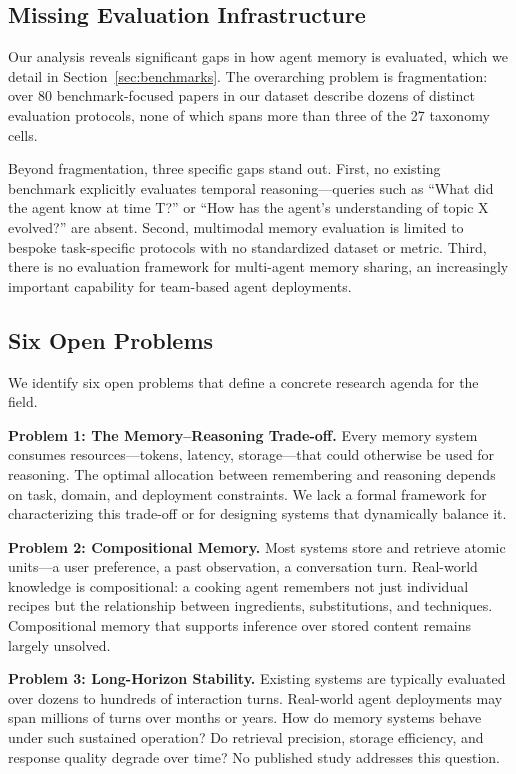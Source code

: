 \subsection{Missing Evaluation Infrastructure}

Our analysis reveals significant gaps in how agent memory is evaluated, which we detail in Section~\ref{sec:benchmarks}. The overarching problem is fragmentation: over 80 benchmark-focused papers in our dataset describe dozens of distinct evaluation protocols, none of which spans more than three of the 27 taxonomy cells.

Beyond fragmentation, three specific gaps stand out. First, no existing benchmark explicitly evaluates temporal reasoning---queries such as ``What did the agent know at time T?'' or ``How has the agent's understanding of topic X evolved?'' are absent. Second, multimodal memory evaluation is limited to bespoke task-specific protocols with no standardized dataset or metric. Third, there is no evaluation framework for multi-agent memory sharing, an increasingly important capability for team-based agent deployments.

\subsection{Six Open Problems}

We identify six open problems that define a concrete research agenda for the field.

\textbf{Problem 1: The Memory--Reasoning Trade-off.} Every memory system consumes resources---tokens, latency, storage---that could otherwise be used for reasoning. The optimal allocation between remembering and reasoning depends on task, domain, and deployment constraints. We lack a formal framework for characterizing this trade-off or for designing systems that dynamically balance it.

\textbf{Problem 2: Compositional Memory.} Most systems store and retrieve atomic units---a user preference, a past observation, a conversation turn. Real-world knowledge is compositional: a cooking agent remembers not just individual recipes but the relationship between ingredients, substitutions, and techniques. Compositional memory that supports inference over stored content remains largely unsolved.

\textbf{Problem 3: Long-Horizon Stability.} Existing systems are typically evaluated over dozens to hundreds of interaction turns. Real-world agent deployments may span millions of turns over months or years. How do memory systems behave under such sustained operation? Do retrieval precision, storage efficiency, and response quality degrade over time? No published study addresses this question.

